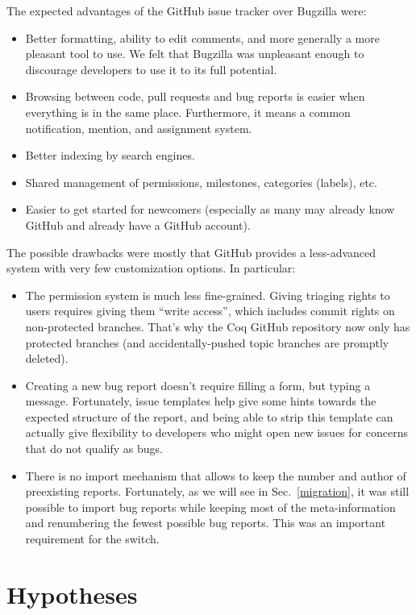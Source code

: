 \documentclass[runningheads]{llncs}
\begin{document}
The expected advantages of the GitHub issue tracker over Bugzilla were:
\begin{itemize}
\item Better formatting, ability to edit comments, and more generally a more pleasant tool to use. We felt that Bugzilla was unpleasant enough to discourage developers to use it to its full potential.
\item Browsing between code, pull requests and bug reports is easier when everything is in the same place. Furthermore, it means a common notification, mention, and assignment system.
\item Better indexing by search engines.
\item Shared management of permissions, milestones, categories (labels), etc.
\item Easier to get started for newcomers (especially as many may already know GitHub and already have a GitHub account).
\end{itemize}

The possible drawbacks were mostly that GitHub provides a less-advanced system with very few customization options. In particular:
\begin{itemize}
\item The permission system is much less fine-grained. Giving triaging rights to users requires giving them ``write access'', which includes commit rights on non-protected branches. That's why the Coq GitHub repository now only has protected branches (and accidentally-pushed topic branches are promptly deleted).
\item Creating a new bug report doesn't require filling a form, but typing a message. Fortunately, issue templates help give some hints towards the expected structure of the report, and being able to strip this template can actually give flexibility to developers who might open new issues for concerns that do not qualify as bugs.
\item There is no import mechanism that allows to keep the number and author of preexisting reports. Fortunately, as we will see in Sec.~\ref{migration}, it was still possible to import bug reports while keeping most of the meta-information and renumbering the fewest possible bug reports. This was an important requirement for the switch.
\end{itemize}

\section{Hypotheses}
\end{document}
